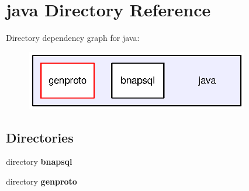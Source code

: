 \section{java Directory Reference}
\label{dir_93c6ba7fb77bae0709fae89c9c13b44a}
Directory dependency graph for java\+:
\nopagebreak
\begin{figure}[H]
\begin{center}
\leavevmode
\includegraphics[width=276pt]{dir_93c6ba7fb77bae0709fae89c9c13b44a_dep}
\end{center}
\end{figure}
\subsection*{Directories}
\begin{DoxyCompactItemize}
\item 
directory {\bf bnapsql}
\item 
directory {\bf genproto}
\end{DoxyCompactItemize}
